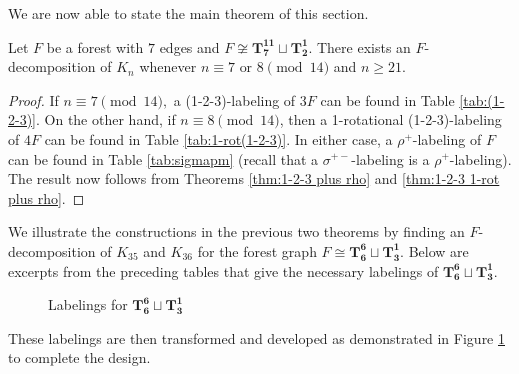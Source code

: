 \documentclass{dmgt}
\begin{document}
We are now able to state the main theorem of this section.
\begin{theorem}\label{thm:7 or 8 mod 14}
    Let $F$ be a forest with $7$ edges and $F \not \cong \mathbf{T_{7}^{11}}\sqcup\mathbf{T_{2}^{1}}$. There exists an $F$-decomposition of $K_n$ whenever $n \equiv 7 \textrm{ or } 8 \pmod{14}$ and $n \geq 21.$
\end{theorem}
\begin{proof}
    If $n \equiv 7 \pmod{14},$ a (1-2-3)-labeling of $3F$ can be found in Table \ref{tab:(1-2-3)}. On the other hand, if $n \equiv 8 \pmod{14}$, then a 1-rotational (1-2-3)-labeling of $4F$ can be found in Table \ref{tab:1-rot(1-2-3)}. In either case, a $\rho^{+}$-labeling of $F$ can be found in Table \ref{tab:sigmapm} (recall that a $\sigma^{+-}$-labeling is a $\rho^{+}$-labeling). The result now follows from Theorems \ref{thm:1-2-3 plus rho} and \ref{thm:1-2-3 1-rot plus rho}. 
\end{proof}
\begin{exm}
We illustrate the constructions in the previous two theorems by finding an $F$-decomposition of $K_{35}$ and $K_{36}$ for the forest graph $F \cong \mathbf{T_{6}^{6}} \sqcup \mathbf{T_{3}^{1}}$. 
\newpage
\noindent Below are excerpts from the preceding tables that give the necessary labelings of $\mathbf{T_{6}^{6}} \sqcup \mathbf{T_{3}^{1}}$.

\begin{figure}[H]
\centering
        \scalebox{0.4}{}
        \caption{Labelings for $\mathbf{T_{6}^{6}} \sqcup \mathbf{T_{3}^{1}}$}
        \label{fig:example chart}
\end{figure}

These labelings are then transformed and developed as demonstrated in Figure \ref{fig:example chart} to complete the design.
\end{exm}

        
        
\end{document}

